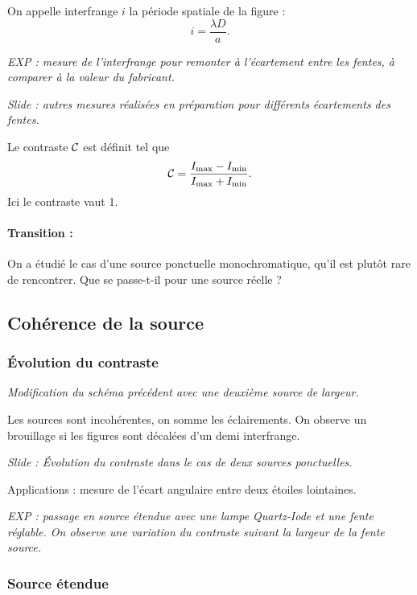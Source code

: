 On appelle interfrange $i$ la période spatiale de la figure :
\begin{equation}
i = \frac{\lambda D}{a}.
\end{equation}

\emph{EXP : mesure de l'interfrange pour remonter à l'écartement entre les fentes, à comparer à la valeur du fabricant.}

\emph{Slide : autres mesures réalisées en préparation pour différents écartements des fentes.}

Le contraste ${\cal{C}}$ est définit tel que
\begin{equation}
{\cal{C}} = \frac{I_\mathrm{max}-I_\mathrm{min}}{I_\mathrm{max}+I_\mathrm{min}}.
\end{equation}
Ici le contraste vaut 1.

\paragraph{Transition : } On a étudié le cas d'une source ponctuelle monochromatique, qu'il est plutôt rare de rencontrer.
Que se passe-t-il pour une source réelle ?

\subsection{Cohérence de la source}

\subsubsection{Évolution du contraste}

\emph{Modification du schéma précédent avec une deuxième source de largeur.}

Les sources sont incohérentes, on somme les éclairements.
On observe un brouillage si les figures sont décalées d'un demi interfrange.

\emph{Slide : Évolution du contraste dans le cas de deux sources ponctuelles.}

Applications : mesure de l'écart angulaire entre deux étoiles lointaines.

\emph{EXP : passage en source étendue avec une lampe Quartz-Iode et une fente réglable. On observe une variation du contraste suivant la largeur de la fente source.}

\subsubsection{Source étendue}

